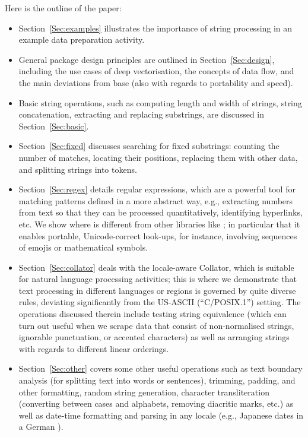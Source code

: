 \documentclass[nojss]{jss}
\begin{document}
Here is the outline of the paper:
\begin{itemize}
\item Section~\ref{Sec:examples} illustrates the importance of string
processing in an example data preparation activity.

\item General package design principles are outlined in
Section~\ref{Sec:design}, including the use cases of deep vectorisation,
the concepts of data flow,
and the main deviations from base 
(also with regards to portability and speed).

\item Basic string operations, such as computing length and width
of strings, string concatenation, extracting and replacing substrings,
are discussed in Section~\ref{Sec:basic}.

\item Section~\ref{Sec:fixed} discusses searching for fixed substrings:
counting the number of matches, locating their positions,
replacing them with other data, and splitting strings into tokens.

\item Section~\ref{Sec:regex} details  regular
expressions, which are a powerful tool for matching patterns defined in
a more abstract way, e.g., extracting numbers from text so that they can
be processed quantitatively, identifying hyperlinks, etc.
We show where  is different from other libraries like ;
in particular that it enables portable, Unicode-correct look-ups,
for instance, involving sequences of emojis or mathematical symbols.

\item Section~\ref{Sec:collator} deals with the locale-aware 
Collator, which is  suitable for natural language processing activities;
this is where we demonstrate that text processing in different languages
or regions is governed by quite diverse rules,
deviating significantly from the US-ASCII (``C/POSIX.1'') setting.
The operations discussed therein include testing string equivalence (which can
turn out useful when we scrape data that consist of non-normalised strings,
ignorable punctuation, or accented characters) as well as arranging strings
with regards to different linear orderings.

\item Section~\ref{Sec:other} covers some other useful operations such
as text boundary analysis (for splitting text into words or sentences),
trimming, padding, and other formatting, random string generation,
character transliteration (converting between cases and alphabets,
removing diacritic marks, etc.) as well as date-time formatting and
parsing in any locale (e.g., Japanese dates in a German ).


\end{itemize}
\end{document}
